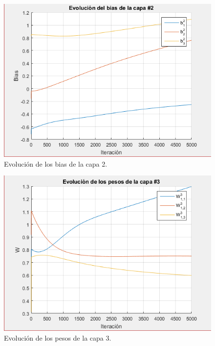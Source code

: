 \begin{figure}[H]
    \begin{center}
        \includegraphics[width=12cm]{4/bias2.png}
        \caption{Evolución de los bias de la capa 2.}
        \label{fig:bias9}
    \end{center}
\end{figure}

\begin{figure}[H]
    \begin{center}
        \includegraphics[width=12cm]{4/pesos3.png}
        \caption{Evolución de los pesos de la capa 3.}
        \label{fig:pesos10}
    \end{center}
\end{figure}

